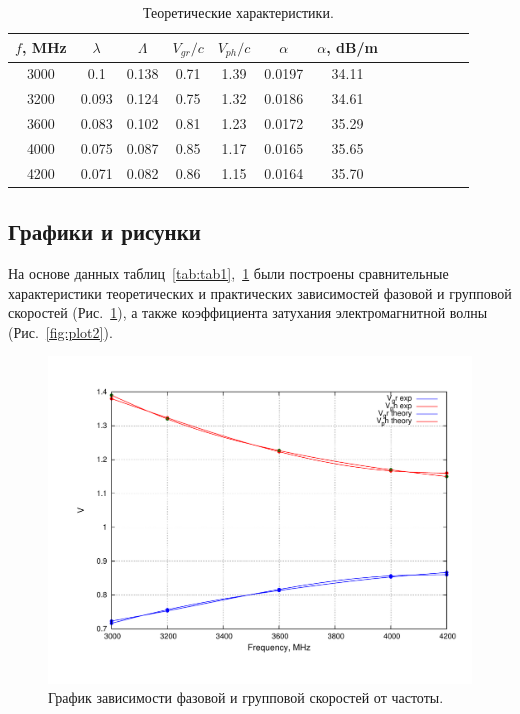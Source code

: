 \documentclass[11pt,a4paper,oneside, reqno]{amsproc}
\begin{document}
\begin{centering}
\begin{table}[h!]
\vspace{10pt}
\begin{tabular}{ccccccccccccc} \toprule %
\newcolumntype{W}{D{.}{.}{2.3}}
$f$, MHz  &  $\lambda$  &  $\Lambda$  &  $V_{gr}/c$  &  $V_{ph}/c$  &  $\alpha$  &  $\alpha$, dB/m  \\
 \midrule
3000  &  0.1    &  0.138  &  0.71  &  1.39  &  0.0197  &  34.11  \\
3200  &  0.093  &  0.124  &  0.75  &  1.32  &  0.0186  &  34.61  \\
3600  &  0.083  &  0.102  &  0.81  &  1.23  &  0.0172  &  35.29  \\
4000  &  0.075  &  0.087  &  0.85  &  1.17  &  0.0165  &  35.65  \\
4200  &  0.071  &  0.082  &  0.86  &  1.15  &  0.0164  &  35.70  \\
\bottomrule
\end{tabular}
\vspace{5 pt}
\caption{Теоретические характеристики.} 
\label{tab:tab2}
\end{table}
\end{centering}

\subsection{Графики и рисунки}
На основе данных таблиц~\ref{tab:tab1},~\ref{tab:tab2} были построены сравнительные характеристики
теоретических и практических зависимостей фазовой и групповой скоростей (Рис.~\ref{fig:plot1}), а также коэффициента
затухания электромагнитной волны (Рис.~\ref{fig:plot2}).

\begin{figure}[hb!]
    \begin{center}
        \includegraphics[width=\textwidth]{plot1.pdf}
    \end{center}
    \caption{График зависимости фазовой и групповой скоростей от частоты.}
    \label{fig:plot1}
\end{figure}
\end{document}
